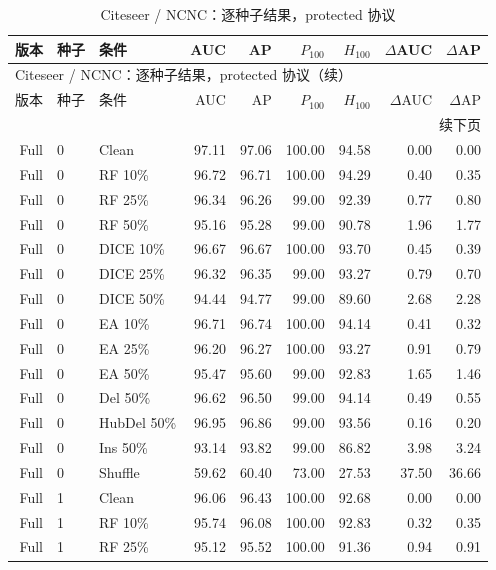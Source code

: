 {\footnotesize
\setlength{\tabcolsep}{3.2pt}
\renewcommand{\arraystretch}{1.10}
\begin{longtable}{rllrrrrrr}
\caption{Citeseer / NCNC：逐种子结果，protected 协议}\\
\toprule
版本 & 种子 & 条件 & AUC & AP & $P_{100}$ & $H_{100}$ & $\Delta$AUC & $\Delta$AP \\
\midrule
\endfirsthead
\multicolumn{9}{l}{Citeseer / NCNC：逐种子结果，protected 协议（续）}\\
\toprule
版本 & 种子 & 条件 & AUC & AP & $P_{100}$ & $H_{100}$ & $\Delta$AUC & $\Delta$AP \\
\midrule
\endhead
\midrule\multicolumn{9}{r}{续下页}\\
\endfoot
\bottomrule
\endlastfoot
Full & 0 & Clean & 97.11 & 97.06 & 100.00 & 94.58 & 0.00 & 0.00 \\
Full & 0 & RF 10\% & 96.72 & 96.71 & 100.00 & 94.29 & 0.40 & 0.35 \\
Full & 0 & RF 25\% & 96.34 & 96.26 & 99.00 & 92.39 & 0.77 & 0.80 \\
Full & 0 & RF 50\% & 95.16 & 95.28 & 99.00 & 90.78 & 1.96 & 1.77 \\
Full & 0 & DICE 10\% & 96.67 & 96.67 & 100.00 & 93.70 & 0.45 & 0.39 \\
Full & 0 & DICE 25\% & 96.32 & 96.35 & 99.00 & 93.27 & 0.79 & 0.70 \\
Full & 0 & DICE 50\% & 94.44 & 94.77 & 99.00 & 89.60 & 2.68 & 2.28 \\
Full & 0 & EA 10\% & 96.71 & 96.74 & 100.00 & 94.14 & 0.41 & 0.32 \\
Full & 0 & EA 25\% & 96.20 & 96.27 & 100.00 & 93.27 & 0.91 & 0.79 \\
Full & 0 & EA 50\% & 95.47 & 95.60 & 99.00 & 92.83 & 1.65 & 1.46 \\
Full & 0 & Del 50\% & 96.62 & 96.50 & 99.00 & 94.14 & 0.49 & 0.55 \\
Full & 0 & HubDel 50\% & 96.95 & 96.86 & 99.00 & 93.56 & 0.16 & 0.20 \\
Full & 0 & Ins 50\% & 93.14 & 93.82 & 99.00 & 86.82 & 3.98 & 3.24 \\
Full & 0 & Shuffle & 59.62 & 60.40 & 73.00 & 27.53 & 37.50 & 36.66 \\
Full & 1 & Clean & 96.06 & 96.43 & 100.00 & 92.68 & 0.00 & 0.00 \\
Full & 1 & RF 10\% & 95.74 & 96.08 & 100.00 & 92.83 & 0.32 & 0.35 \\
Full & 1 & RF 25\% & 95.12 & 95.52 & 100.00 & 91.36 & 0.94 & 0.91 \\

\end{longtable}}
